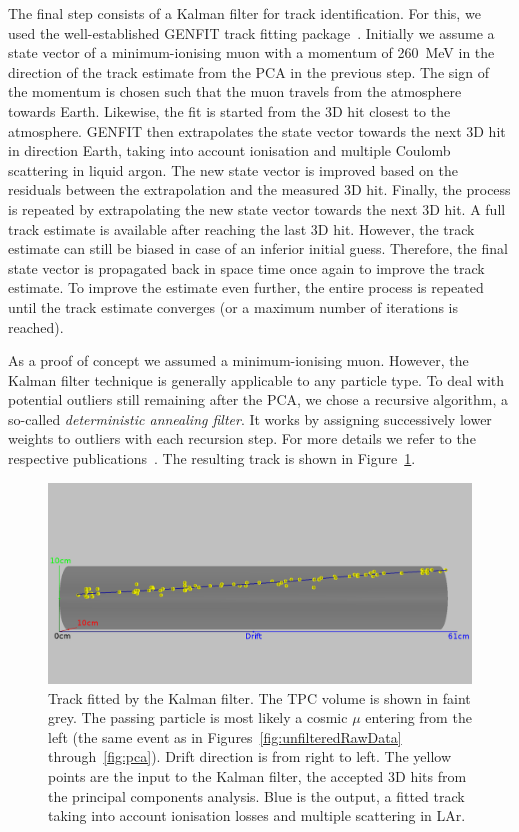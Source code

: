 \documentclass[instruments,article,submit,moreauthors,pdftex]{Definitions/mdpi}
\begin{document}
The final step consists of a Kalman filter for track identification.
For this, we used the well-established GENFIT track fitting package~\cite{genfit1, genfit2, genfit3}.
Initially we assume a state vector of a minimum-ionising muon with a momentum of \SI{260}{\mega\electronvolt} in the direction of the track estimate from the PCA in the previous step.
The sign of the momentum is chosen such that the muon travels from the atmosphere towards Earth.
Likewise, the fit is started from the 3D hit closest to the atmosphere.
GENFIT then extrapolates the state vector towards the next 3D hit in direction Earth, taking into account ionisation and multiple Coulomb scattering in liquid argon.
The new state vector is improved based on the residuals between the extrapolation and the measured 3D hit.
Finally, the process is repeated by extrapolating the new state vector towards the next 3D hit.
A full track estimate is available after reaching the last 3D hit.
However, the track estimate can still be biased in case of an inferior initial guess.
Therefore, the final state vector is propagated back in space time once again to improve the track estimate.
To improve the estimate even further, the entire process is repeated until the track estimate converges (or a maximum number of iterations is reached).

As a proof of concept we assumed a minimum-ionising muon.
However, the Kalman filter technique is generally applicable to any particle type.
To deal with potential outliers still remaining after the PCA, we chose a recursive algorithm, a so-called \emph{deterministic annealing filter}.
It works by assigning successively lower weights to outliers with each recursion step.
For more details we refer to the respective publications~\cite{genfit1, genfit2, genfit3}.
The resulting track is shown in Figure~\ref{fig:kalman}.

\begin{figure}[htb]
	\centering
	\includegraphics[width=\textwidth]{event967_kalman}
	\caption{Track fitted by the Kalman filter.
		The TPC volume is shown in faint grey.
		The passing particle is most likely a cosmic $\mu$ entering from the left (the same event as in Figures~\ref{fig:unfilteredRawData} through~\ref{fig:pca}).
		Drift direction is from right to left.
		The yellow points are the input to the Kalman filter, the accepted 3D hits from the principal components analysis.
		Blue is the output, a fitted track taking into account ionisation losses and multiple scattering in LAr.}
	\label{fig:kalman}
\end{figure}
\end{document}
